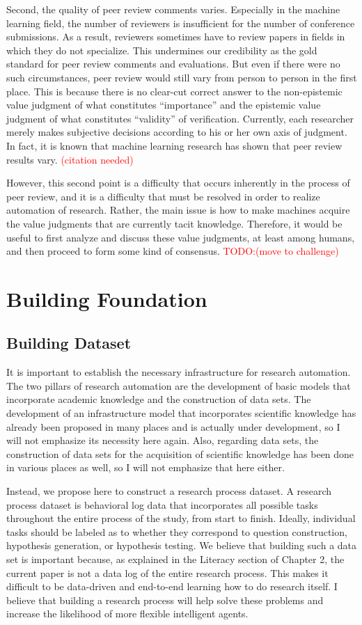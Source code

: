 Second, the quality of peer review comments varies. Especially in the machine learning field, the number of reviewers is insufficient for the number of conference submissions. As a result, reviewers sometimes have to review papers in fields in which they do not specialize. This undermines our credibility as the gold standard for peer review comments and evaluations. But even if there were no such circumstances, peer review would still vary from person to person in the first place. This is because there is no clear-cut correct answer to the non-epistemic value judgment of what constitutes ``importance'' and the epistemic value judgment of what constitutes ``validity'' of verification. Currently, each researcher merely makes subjective decisions according to his or her own axis of judgment. In fact, it is known that machine learning research has shown that peer review results vary.
\textcolor{red}{(citation needed)}

However, this second point is a difficulty that occurs inherently in the process of peer review, and it is a difficulty that must be resolved in order to realize automation of research. Rather, the main issue is how to make machines acquire the value judgments that are currently tacit knowledge. Therefore, it would be useful to first analyze and discuss these value judgments, at least among humans, and then proceed to form some kind of consensus.
\textcolor{red}{TODO:(move to challenge)}

\section{Building Foundation}
\subsection{Building Dataset}
It is important to establish the necessary infrastructure for research automation. The two pillars of research automation are the development of basic models that incorporate academic knowledge and the construction of data sets. The development of an infrastructure model that incorporates scientific knowledge has already been proposed in many places and is actually under development, so I will not emphasize its necessity here again. Also, regarding data sets, the construction of data sets for the acquisition of scientific knowledge has been done in various places as well, so I will not emphasize that here either.

Instead, we propose here to construct a research process dataset. A research process dataset is behavioral log data that incorporates all possible tasks throughout the entire process of the study, from start to finish. Ideally, individual tasks should be labeled as to whether they correspond to question construction, hypothesis generation, or hypothesis testing. We believe that building such a data set is important because, as explained in the Literacy section of Chapter 2, the current paper is not a data log of the entire research process. This makes it difficult to be data-driven and end-to-end learning how to do research itself. I believe that building a research process will help solve these problems and increase the likelihood of more flexible intelligent agents.

